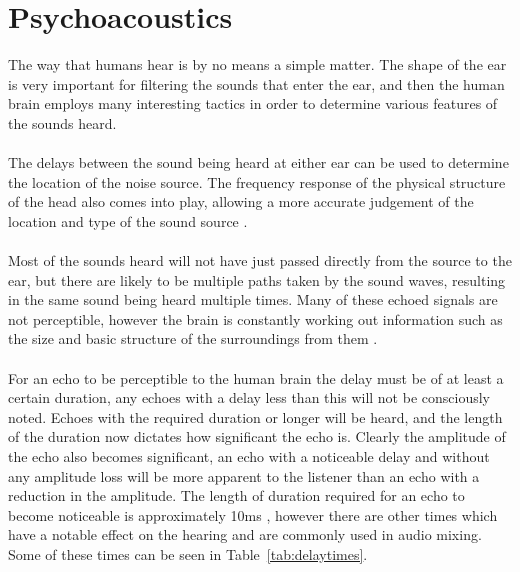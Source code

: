 \section{Psychoacoustics}
The way that humans hear is by no means a simple matter.
The shape of the ear is very important for filtering the sounds that enter the ear, and then the human brain employs many interesting tactics in order to determine various features of the sounds heard.
\\
\\
The delays between the sound being heard at either ear can be used to determine the location of the noise source.
The frequency response of the physical structure of the head also comes into play, allowing a more accurate judgement of the location and type of the sound source \cite{CogPsychMus}.
\\
\\
Most of the sounds heard will not have just passed directly from the source to the ear, but there are likely to be multiple paths taken by the sound waves, resulting in the same sound being heard multiple times.
Many of these echoed signals are not perceptible, however the brain is constantly working out information such as the size and basic structure of the surroundings from them \cite{CogPsychMus}.
\\
\\
For an echo to be perceptible to the human brain the delay must be of at least a certain duration, any echoes with a delay less than this will not be consciously noted.
Echoes with the required duration or longer will be heard, and the length of the duration now dictates how significant the echo is.
Clearly the amplitude of the echo also becomes significant, an echo with a noticeable delay and without any amplitude loss will be more apparent to the listener than an echo with a reduction in the amplitude.
The length of duration required for an echo to become noticeable is approximately 10ms \cite{TimeSpaceHearing}, however there are other times which have a notable effect on the hearing and are commonly used in audio mixing.
Some of these times can be seen in Table~\ref{tab:delaytimes}.

